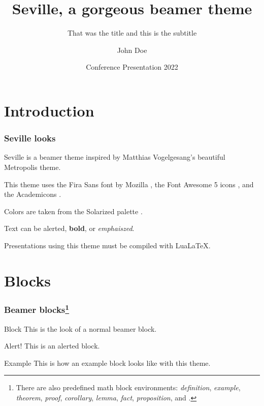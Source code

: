 \documentclass{beamer}
\title{Seville, a gorgeous beamer theme}
\subtitle{That was the title and this is the subtitle}
\author{John Doe}
\date{Conference Presentation 2022}
\institute{University of \LaTeX}
\begin{document}
\begin{frame}

    \titlepage

\end{frame}

\section{Introduction}

\begin{frame}
    \frametitle{Seville looks}

    Seville is a beamer theme inspired by Matthias Vogelgesang's beautiful Metropolis theme.

    This theme uses the Fira Sans font by Mozilla \faFirefoxBrowser, the Font Awesome 5 icons \faFontAwesome, and the Academicons \aiAcademiaSquare.

    Colors are taken from the Solarized palette \faPalette.

    Text can be \alert{alerted}, \textbf{bold}, or \emph{emphaiszed}.

    Presentations using this theme must be compiled with Lua\LaTeX.

\end{frame}

\section{Blocks}

\begin{frame}
    \frametitle{Beamer blocks\footnote{There are also predefined math block environments: \emph{definition}, \emph{example}, \emph{theorem}, \emph{proof}, \emph{corollary}, \emph{lemma}, \emph{fact}, \emph{proposition}, and     .}}

    \begin{block}{Block}
        This is the look of a normal beamer block.
    \end{block}

    \begin{alertblock}{Alert!}
        This is an alerted block.
    \end{alertblock}

    \begin{exampleblock}{Example}
        This is how an example block looks like with this theme.
    \end{exampleblock}

\end{frame}
\end{document}

